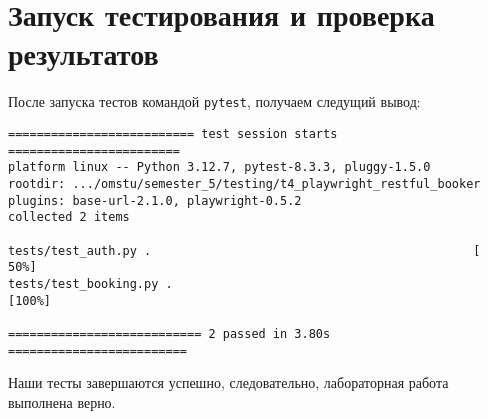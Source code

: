 \section{Запуск тестирования и проверка результатов}

После запуска тестов командой \texttt{pytest}, получаем следущий вывод:

\begin{verbatim}
========================== test session starts ========================
platform linux -- Python 3.12.7, pytest-8.3.3, pluggy-1.5.0
rootdir: .../omstu/semester_5/testing/t4_playwright_restful_booker
plugins: base-url-2.1.0, playwright-0.5.2
collected 2 items                                        

tests/test_auth.py .                                             [ 50%]
tests/test_booking.py .                                          [100%]

=========================== 2 passed in 3.80s =========================
\end{verbatim}

Наши тесты завершаются успешно, следовательно, лабораторная работа выполнена верно.
